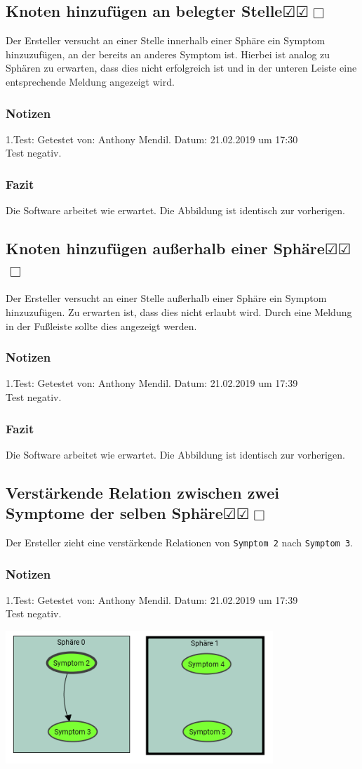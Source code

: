 \documentclass{scrartcl}
\newcommand{\subsectiont}[2]{\subsection[#1]{#1{\normalsize\normalfont #2}}}
\newcommand{\leer}{$\Box$}
\newcommand{\ok}{$\CheckedBox$}
\begin{document}
\subsectiont{Knoten hinzufügen an belegter Stelle}{\dotfill\ok\ok\leer}
Der Ersteller versucht an einer Stelle innerhalb einer Sphäre ein Symptom hinzuzufügen, an der bereits an anderes Symptom ist. Hierbei ist analog zu Sphären zu erwarten, dass dies nicht erfolgreich ist und in der unteren Leiste eine entsprechende Meldung angezeigt wird.
\subsubsection{Notizen}
1.Test: Getestet von: Anthony Mendil. Datum: 21.02.2019 um 17:30 \\
Test negativ.
\subsubsection{Fazit}
Die Software arbeitet wie erwartet. Die Abbildung ist identisch zur vorherigen.

\subsectiont{Knoten hinzufügen außerhalb einer Sphäre}{\dotfill\ok\ok\leer}
Der Ersteller versucht an einer Stelle außerhalb einer Sphäre ein Symptom hinzuzufügen. Zu erwarten ist, dass dies nicht erlaubt wird. Durch eine Meldung in der Fußleiste sollte dies angezeigt werden. 
\subsubsection{Notizen}
1.Test: Getestet von: Anthony Mendil. Datum: 21.02.2019 um 17:39 \\
Test negativ.
\subsubsection{Fazit}
Die Software arbeitet wie erwartet. Die Abbildung ist identisch zur vorherigen.

\subsectiont{Verstärkende Relation zwischen zwei Symptome der selben Sphäre}{\dotfill\ok\ok\leer}
Der Ersteller zieht eine verstärkende Relationen von \texttt{Symptom 2} nach \texttt{Symptom 3}. 
\subsubsection{Notizen}
1.Test: Getestet von: Anthony Mendil. Datum: 21.02.2019 um 17:39 \\
Test negativ.
\begin{center}
\includegraphics[height=5cm]{1_6.PNG}
\end{center}
\end{document}

